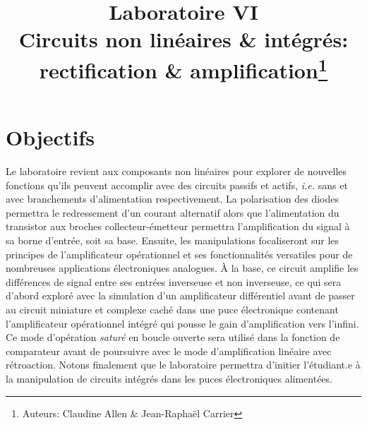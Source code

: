\documentclass[canadien,12pt,oneside,letterpaper]{article}
\title{\textbf{Laboratoire VI}\\Circuits non linéaires \& intégrés:\\rectification \& amplification\thanks{Auteurs: Claudine Allen \& Jean-Raphaël Carrier}}
\date{}
\begin{document}
\maketitle \vspace{-2cm}

\section{Objectifs}

Le laboratoire revient aux composants non linéaires pour explorer de nouvelles fonctions qu'ils peuvent accomplir avec des circuits passifs et actifs, \textit{i.e.} sans et avec branchements d'alimentation respectivement. La polarisation des diodes permettra le redressement d’un courant alternatif alors que l'alimentation du transistor aux broches collecteur-émetteur permettra l'amplification du signal à sa borne d'entrée, soit sa base. Ensuite, les manipulations focaliseront sur les principes de l’amplificateur opérationnel et ses fonctionnalités versatiles pour de nombreuses applications électroniques analogues. À la base, ce circuit amplifie les différences de signal entre ses entrées inverseuse et non inverseuse, ce qui sera d'abord exploré avec la simulation d’un amplificateur différentiel avant de passer au circuit miniature et complexe caché dans une puce électronique contenant l'amplificateur opérationnel intégré qui pousse le gain d'amplification vers l'infini. Ce mode d’opération \textit{saturé} en boucle ouverte sera utilisé dans la fonction de comparateur avant de poursuivre avec le mode d’amplification linéaire avec rétroaction. Notons finalement que le laboratoire permettra d'initier l'étudiant.e à la manipulation de circuits intégrés dans les puces électroniques alimentées.
\end{document}
